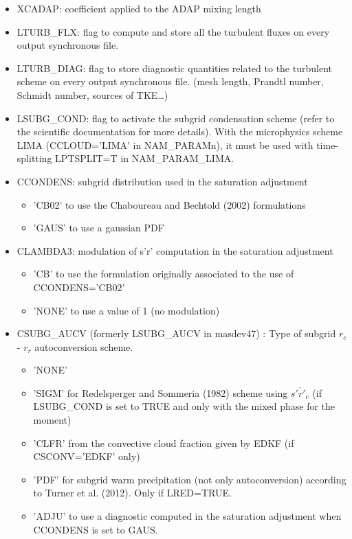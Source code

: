 \begin{itemize}
\item
{} 
XCADAP: coefficient applied to the ADAP mixing length

\item
{}
LTURB\_FLX: flag to compute and store all the turbulent fluxes
 on every output synchronous file.

\item
{}
LTURB\_DIAG: flag to  store diagnostic quantities related to the 
turbulent scheme  on every output synchronous file. (mesh length, Prandtl
number, Schmidt number, sources of TKE\ldots)

\item
{}
LSUBG\_COND: flag to activate the subgrid condensation scheme (refer to the scientific 
documentation for more details).  With the microphysics scheme LIMA (CCLOUD='LIMA' in NAM\_PARAMn), it must be used with time-splitting LPTSPLIT=T in NAM\_PARAM\_LIMA.

\item
{}
CCONDENS: subgrid distribution used in the saturation adjustment
\begin{itemize}
\item  'CB02' to use the Chaboureau and Bechtold (2002) formulations
\item 'GAUS' to use a gaussian PDF
\end{itemize}

\item
{}
CLAMBDA3: modulation of s'r' computation in the saturation adjustment
\begin{itemize}
\item 'CB' to use the formulation originally associated to the use of CCONDENS='CB02'
\item 'NONE' to use a value of 1 (no modulation)
\end{itemize}

\item
{}
CSUBG\_AUCV (formerly LSUBG\_AUCV in masdev47) : Type of subgrid $r_c$ - $r_r$ autoconversion scheme.
\begin{itemize}
\item  'NONE'
\item 'SIGM' for Redelsperger and Sommeria (1982) scheme using $\overline{s'r'_{c}}$ 
(if LSUBG\_COND
is set to TRUE and only with the mixed phase for the moment)
\item 'CLFR' from the convective cloud fraction given by EDKF 
(if CSCONV='EDKF' only)
\item 'PDF' for subgrid warm precipitation (not only autoconversion) according to Turner et al. (2012). Only if LRED=TRUE.
\item 'ADJU' to use a diagnostic computed in the saturation adjustment when CCONDENS is set to GAUS.
\end{itemize}


\end{itemize}
